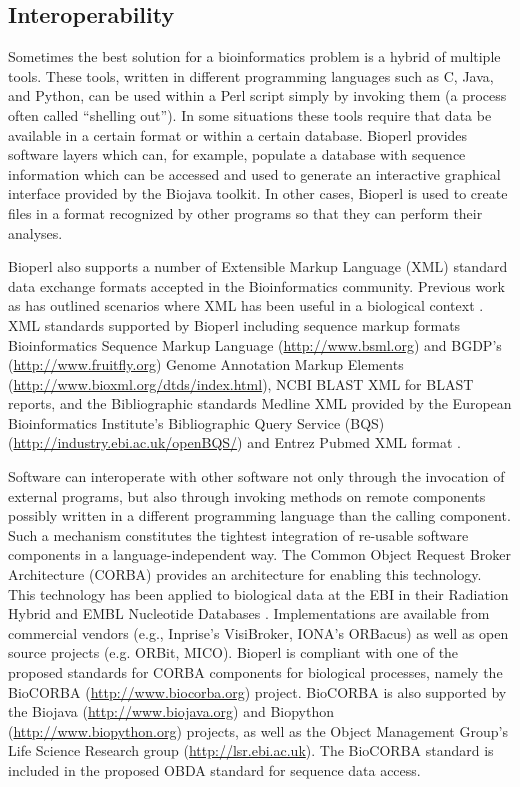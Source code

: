 \documentclass[12pt]{article}
\begin{document}
\subsection{Interoperability}

Sometimes the best solution for a bioinformatics problem is a hybrid
of multiple tools.  These tools, written in different programming
languages such as C, Java, and Python, can be used within a Perl
script simply by invoking them (a process often called ``shelling
out'').  In some situations these tools require that data be available
in a certain format or within a certain database.  Bioperl provides
software layers which can, for example, populate a database with
sequence information which can be accessed and used to generate an
interactive graphical interface provided by the Biojava toolkit.
In other cases, Bioperl is used to create files in a format recognized
by other programs so that they can perform their analyses. 

Bioperl also supports a number of Extensible Markup Language (XML) 
standard data exchange formats accepted in the Bioinformatics
community.  Previous work as has outlined scenarios
where XML has been useful in a biological context
\cite{xmlbioinformatics}.  XML standards supported by Bioperl
including sequence markup formats Bioinformatics Sequence Markup
Language (\url{http://www.bsml.org}) and BGDP's
(\url{http://www.fruitfly.org}) Genome Annotation Markup Elements
(\url{http://www.bioxml.org/dtds/index.html}), NCBI BLAST XML for
BLAST reports, and the Bibliographic standards Medline XML provided
by the European Bioinformatics Institute's Bibliographic 
Query Service (BQS) (\url{http://industry.ebi.ac.uk/openBQS/}) and 
Entrez Pubmed XML format \cite{entrez}.

Software can interoperate with other software not only through the
invocation of external programs, but also through invoking methods on
remote components possibly written in a different programming language
than the calling component.  Such a mechanism constitutes the tightest
integration of re-usable software components in a language-independent
way.  The Common Object Request Broker Architecture (CORBA)
\cite{corba} provides an architecture for enabling this technology.
This technology has been applied to biological data at the EBI in
their Radiation Hybrid \cite{rhdb} and EMBL Nucleotide
Databases \cite{embl-corba}. Implementations are
available from commercial vendors (e.g., Inprise's VisiBroker, IONA's
ORBacus) as well as open source projects (e.g. ORBit, MICO).  Bioperl
is compliant with one of the proposed standards for CORBA components
for biological processes, namely the BioCORBA
(\url{http://www.biocorba.org}) project.  BioCORBA is also supported
by the Biojava (\url{http://www.biojava.org}) and Biopython
(\url{http://www.biopython.org}) projects, as well as the Object
Management Group's Life Science Research group
(\url{http://lsr.ebi.ac.uk}).  The BioCORBA standard is included in
the proposed OBDA standard for sequence data access.
\end{document}
